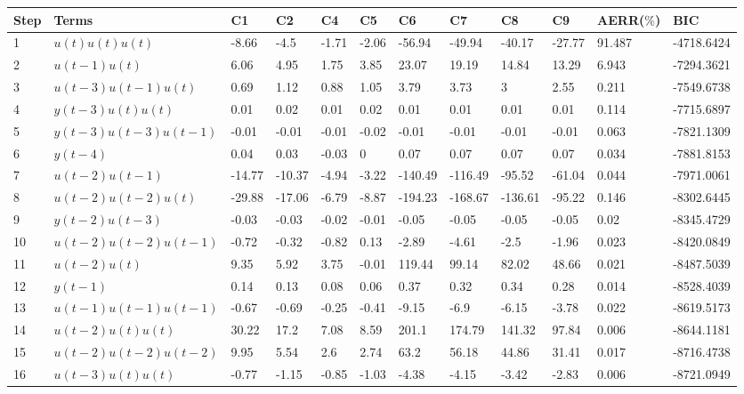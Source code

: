 \begin{tabular}{llllllllllll}
Step & Terms & C1 & C2 & C4 & C5 & C6 & C7 & C8 & C9 & AERR($\%$) & BIC \\ 
\hline 
1 & $u(t)u(t)u(t)$ & -8.66 & -4.5 & -1.71 & -2.06 & -56.94 & -49.94 & -40.17 & -27.77 & 91.487 & -4718.6424 \\ 
2 & $u(t-1)u(t)$ & 6.06 & 4.95 & 1.75 & 3.85 & 23.07 & 19.19 & 14.84 & 13.29 & 6.943 & -7294.3621 \\ 
3 & $u(t-3)u(t-1)u(t)$ & 0.69 & 1.12 & 0.88 & 1.05 & 3.79 & 3.73 & 3 & 2.55 & 0.211 & -7549.6738 \\ 
4 & $y(t-3)u(t)u(t)$ & 0.01 & 0.02 & 0.01 & 0.02 & 0.01 & 0.01 & 0.01 & 0.01 & 0.114 & -7715.6897 \\ 
5 & $y(t-3)u(t-3)u(t-1)$ & -0.01 & -0.01 & -0.01 & -0.02 & -0.01 & -0.01 & -0.01 & -0.01 & 0.063 & -7821.1309 \\ 
6 & $y(t-4)$ & 0.04 & 0.03 & -0.03 & 0 & 0.07 & 0.07 & 0.07 & 0.07 & 0.034 & -7881.8153 \\ 
7 & $u(t-2)u(t-1)$ & -14.77 & -10.37 & -4.94 & -3.22 & -140.49 & -116.49 & -95.52 & -61.04 & 0.044 & -7971.0061 \\ 
8 & $u(t-2)u(t-2)u(t)$ & -29.88 & -17.06 & -6.79 & -8.87 & -194.23 & -168.67 & -136.61 & -95.22 & 0.146 & -8302.6445 \\ 
9 & $y(t-2)u(t-3)$ & -0.03 & -0.03 & -0.02 & -0.01 & -0.05 & -0.05 & -0.05 & -0.05 & 0.02 & -8345.4729 \\ 
10 & $u(t-2)u(t-2)u(t-1)$ & -0.72 & -0.32 & -0.82 & 0.13 & -2.89 & -4.61 & -2.5 & -1.96 & 0.023 & -8420.0849 \\ 
11 & $u(t-2)u(t)$ & 9.35 & 5.92 & 3.75 & -0.01 & 119.44 & 99.14 & 82.02 & 48.66 & 0.021 & -8487.5039 \\ 
12 & $y(t-1)$ & 0.14 & 0.13 & 0.08 & 0.06 & 0.37 & 0.32 & 0.34 & 0.28 & 0.014 & -8528.4039 \\ 
13 & $u(t-1)u(t-1)u(t-1)$ & -0.67 & -0.69 & -0.25 & -0.41 & -9.15 & -6.9 & -6.15 & -3.78 & 0.022 & -8619.5173 \\ 
14 & $u(t-2)u(t)u(t)$ & 30.22 & 17.2 & 7.08 & 8.59 & 201.1 & 174.79 & 141.32 & 97.84 & 0.006 & -8644.1181 \\ 
15 & $u(t-2)u(t-2)u(t-2)$ & 9.95 & 5.54 & 2.6 & 2.74 & 63.2 & 56.18 & 44.86 & 31.41 & 0.017 & -8716.4738 \\ 
16 & $u(t-3)u(t)u(t)$ & -0.77 & -1.15 & -0.85 & -1.03 & -4.38 & -4.15 & -3.42 & -2.83 & 0.006 & -8721.0949 \\ 
\hline 
\end{tabular}